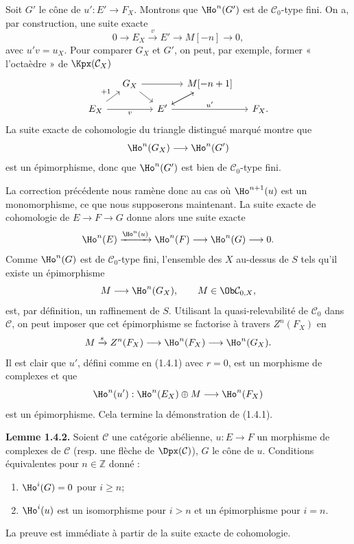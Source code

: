 \documentclass[11pt]{article}
\begin{document}
Soit \(G'\) le cône de \(u':E'\to F_X\). Montrons que \(\Ho^n(G')\) est de \(\mathcal C_0\)-type fini. On a, par construction, une suite exacte
\[
  0\longrightarrow E_X\xrightarrow{v}E'\longrightarrow M[-n]\longrightarrow 0,
\]
avec \(u'v=u_X\). Pour comparer \(G_X\) et \(G'\), on peut, par exemple, former « l'octaèdre » de \(\Kpx(\mathcal C_X)\)
\[
\begin{tikzcd}[column sep=small,row sep=small]
& G_X \arrow[rr] \arrow[dr] && M[-n+1] \arrow[dl]\\
E_X \arrow[ur,"+1"] \arrow[rr,"v"'] && E' \arrow[ur] \arrow[rr,"u'"] && F_X .
\end{tikzcd}
\]
La suite exacte de cohomologie du triangle distingué marqué montre que
\[
  \Ho^n(G_X)\longrightarrow \Ho^n(G')
\]
est un épimorphisme, donc que \(\Ho^n(G')\) est bien de \(\mathcal C_0\)-type fini.

La correction précédente nous ramène donc au cas où \(\Ho^{n+1}(u)\) est un monomorphisme, ce que nous supposerons maintenant. La suite exacte de cohomologie de \(E\to F\to G\) donne alors une suite exacte
\[
  \Ho^n(E)\xrightarrow{\Ho^n(u)}
  \Ho^n(F)\longrightarrow \Ho^n(G)\longrightarrow 0.
\]
Comme \(\Ho^n(G)\) est de \(\mathcal C_0\)-type fini, l'ensemble des \(X\) au-dessus de \(S\) tels qu'il existe un épimorphisme
\[
  M\longrightarrow \Ho^n(G_X),\qquad M\in\Ob\mathcal C_{0,X},
\]
est, par définition, un raffinement de \(S\). Utilisant la quasi-relevabilité de \(\mathcal C_0\) dans \(\mathcal C\), on peut imposer que cet épimorphisme se factorise à travers \(Z^n(F_X)\) en
\[
  M\xrightarrow{s}Z^n(F_X)\longrightarrow \Ho^n(F_X)\longrightarrow \Ho^n(G_X).
\]
Il est clair que \(u'\), défini comme en (1.4.1) avec \(r=0\), est un morphisme de complexes et que
\[
  \Ho^n(u'):\Ho^n(E_X)\oplus M\longrightarrow \Ho^n(F_X)
\]
est un épimorphisme. Cela termine la démonstration de (1.4.1).

\textbf{Lemme 1.4.2.} Soient \(\mathcal C\) une catégorie abélienne, \(u:E\to F\) un morphisme de complexes de \(\mathcal C\) (resp. une flèche de \(\Dpx(\mathcal C)\)), \(G\) le cône de \(u\). Conditions équivalentes pour \(n\in\mathbb Z\) donné :
\begin{enumerate}[label=(\roman*)]
\item \(\Ho^i(G)=0\) pour \(i\geq n\);
\item \(\Ho^i(u)\) est un isomorphisme pour \(i>n\) et un épimorphisme pour \(i=n\).
\end{enumerate}
La preuve est immédiate à partir de la suite exacte de cohomologie.
\end{document}
